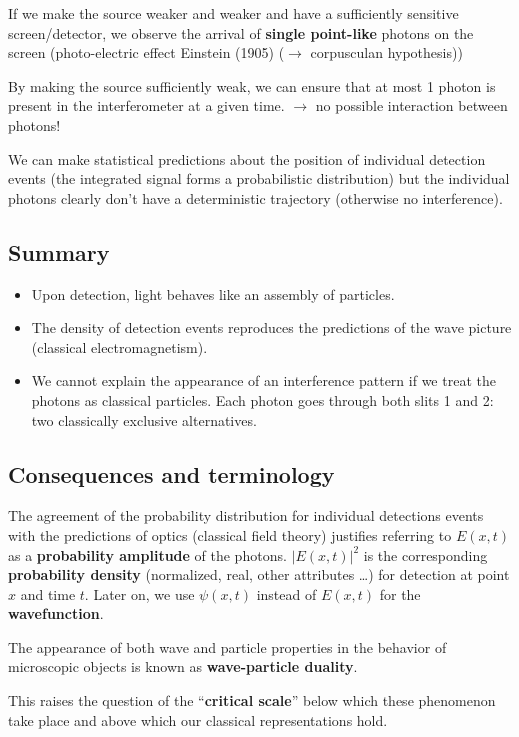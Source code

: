 \noindent
If we make the source weaker and weaker and have a sufficiently sensitive screen/detector, we observe the arrival of \textbf{single point-like} photons on the screen (photo-electric effect Einstein (1905) ($ \to $ corpusculan hypothesis))\par
By making the source sufficiently weak, we can ensure that at most 1 photon is present in the interferometer at a given time. $ \rightarrow $ no possible interaction between photons!\par
\begin{center}
\end{center}
We can make statistical predictions about the position of individual detection events (the integrated signal forms a probabilistic distribution) but the individual photons clearly don't have a deterministic trajectory (otherwise no interference).

\subsection*{Summary}

\begin{itemize}
	\item Upon detection, light behaves like an assembly of particles.
	\item The density of detection events reproduces the predictions of the wave picture (classical electromagnetism).
	\item We cannot explain the appearance of an interference pattern if we treat the photons as classical particles. Each photon goes through both slits 1 and 2: two classically exclusive alternatives.
\end{itemize}

\subsection{Consequences and terminology}

The agreement of the probability distribution for individual detections events with the predictions of optics (classical field theory) justifies referring to $ E(x,t) $ as a \textbf{probability amplitude} of the photons. $ |E(x,t)|^2 $ is the corresponding \textbf{probability density} (normalized, real, other attributes \dots) for detection at point $ x $ and time $ t $. Later on, we use $ \psi(x,t) $ instead of $ E(x,t) $ for the \textbf{wavefunction}.\par
The appearance of both wave and particle properties in the behavior of microscopic objects is known as \textbf{wave-particle duality}.\par
This raises the question of the ``\textbf{critical scale}'' below which these phenomenon take place and above which our classical representations hold.

